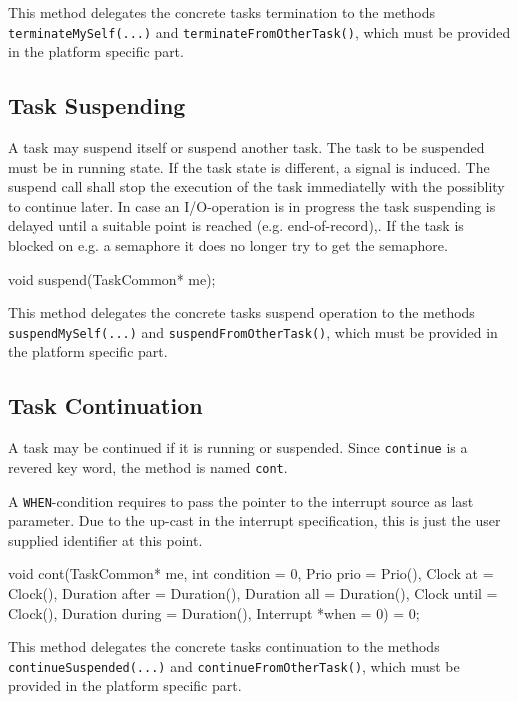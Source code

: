 This method delegates the concrete tasks termination to the methods
\verb|terminateMySelf(...)| and \verb|terminateFromOtherTask()|,
which must be provided in the platform specific part.

\subsection{Task Suspending}
A task may suspend itself or suspend another task.
The task to be suspended must be in running state. If the task state
is different, a signal is induced.
The suspend call shall 
stop the execution of the task immediatelly with the possiblity to 
continue later.
In case an I/O-operation is in progress the task suspending is delayed
until a suitable point is reached (e.g. end-of-record),. 
If the task is blocked on e.g. a semaphore it does no longer try to get 
the semaphore.
 
\begin{CppCode}
void suspend(TaskCommon* me);
\end{CppCode}

This method delegates the concrete tasks suspend operation to the methods
\verb|suspendMySelf(...)| and \verb|suspendFromOtherTask()|,
which must be provided in the platform specific part.

\subsection{Task Continuation}
A task may be continued if it is running or suspended.
Since \verb|continue| is a revered key word, the method is named \verb|cont|.

A \verb|WHEN|-condition requires to pass the pointer to the interrupt source
as last parameter. Due to the up-cast in the interrupt specification, this
is just the user supplied identifier at this point.

\begin{CppCode}
void cont(TaskCommon* me,
          int condition = 0,
          Prio prio = Prio(),
          Clock at = Clock(),
          Duration after = Duration(),
          Duration all = Duration(),
          Clock until = Clock(),
          Duration during = Duration(),
          Interrupt *when = 0) = 0;
\end{CppCode}

This method delegates the concrete tasks continuation to the methods
\verb|continueSuspended(...)| and \verb|continueFromOtherTask()|,
which must be provided in the platform specific part.

